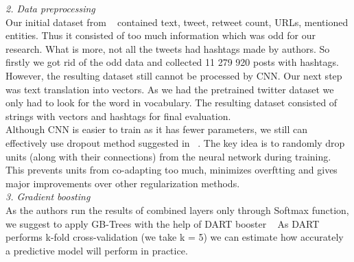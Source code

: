 \documentclass[jou,apacite]{apa6}
\begin{document}
\emph{\large{2. Data preprocessing}}\\
Our initial dataset from ~\cite{DBLP} contained text, tweet, retweet count, URLs, mentioned entities. Thus it consisted of too much information which was odd for our research. What is more, not all the tweets had hashtags made by authors. So firstly we got rid of the odd data and collected 11 279 920 posts with hashtags.\\
However, the resulting dataset still cannot be processed by CNN. Our next step was text translation into vectors. As we had the pretrained twitter dataset we only had to look for the word in vocabulary. The resulting dataset consisted of strings with vectors and hashtags for final evaluation.\\
Although CNN is easier to train as it has fewer parameters, we still can effectively use dropout method suggested in ~\cite{Drop}. The key idea is to  randomly drop units (along with their connections) from the neural network during training. This prevents units from co-adapting too much, minimizes overftting and gives major improvements over other regularization methods.\\

\emph{\large{3. Gradient boosting}}\\
As the authors run the results of combined layers only through Softmax function, we suggest to apply GB-Trees with the help of DART booster ~\cite{Dart} As DART performs k-fold cross-validation (we take k = 5) we can estimate how accurately a predictive model will perform in practice.
\end{document}
